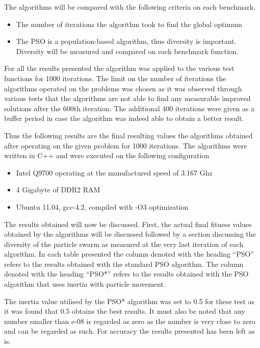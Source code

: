 The algorithms will be compared with the following criteria on each benchmark.
\begin{itemize}
\item The number of iterations the algorithm took to find the global optimum
\item The PSO is a population-based algorithm, thus diversity is important. Diversity will be measured and compared on each benchmark function.
\end{itemize}
For all the results presented the algorithm was applied to the various test functions for 1000 iterations. The limit on the number of iterations the algorithms operated on the problems was chosen as it was observed through various tests that the algorithms are not able to find any measurable improved solutions after the 600th iteration. The additional 400 iterations were given as a buffer period in case the algorithm was indeed able to obtain a better result.

Thus the following results are the final resulting values the algorithms obtained after operating on the given problem for 1000 iterations. The algorithms were written in C++ and were executed on the following configuration
\begin{itemize}
\item Intel Q9700 operating at the manufactured speed of 3.167 Ghz
\item 4 Gigabyte of DDR2 RAM
\item Ubuntu 11.04, gcc-4.2, compiled with -O3 optimization
\end{itemize}

The results obtained will now be discussed. First, the actual final fitness values obtained by the algorithms will be discussed followed by a section discussing the diversity of the particle swarm as measured at the very last iteration of each algorithm. In each table presented the column denoted with the heading ``PSO'' refers to the results obtained with the standard PSO algorithm. The column denoted with the heading ``PSO*'' refers to the results obtained with the PSO algorithm that uses inertia with particle movement. 

The inertia value utilised by the PSO* algorithm was set to 0.5 for these test as it was found that 0.5 obtains the best results. It must also be noted that any number smaller than e-08 is regarded as zero as the number is very close to zero and can be regarded as such. For accuracy the results presented has been left as is.
